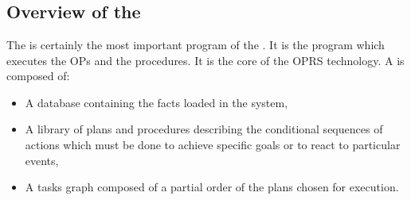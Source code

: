 
\part{\CPK{}}



\chapter*{Overview of the \CPK{}}

The \CPK{} is certainly the most important program of the \COPRSDE{}. It is the
program which executes the OPs and the procedures. It is the core of the OPRS
technology. A \CPK{} is composed of:

\begin{itemize}

\item A database containing the facts loaded in the system,

\item A library of plans and procedures describing the conditional
sequences of actions which must be done to achieve specific goals or to react
to particular events,

\item A tasks graph composed of a partial order of the plans chosen for
execution.

\end{itemize}

